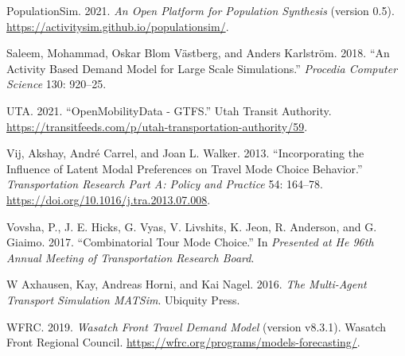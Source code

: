 \documentclass[12pt, oneside, openright]{byuthesis}
\newlength{\cslhangindent}
\newlength{\cslentryspacingunit} %
\newenvironment{CSLReferences}[2] %
 {%
  \setlength{\parindent}{0pt}
  \ifodd #1
  \let\oldpar\par
  \def\par{\hangindent=\cslhangindent\oldpar}
  \fi
  \setlength{\parskip}{#2\cslentryspacingunit}
 }%
 {}
\begin{document}
\begin{CSLReferences}{1}{0}
\leavevmode{}%
PopulationSim. 2021. \emph{An Open Platform for Population Synthesis} (version 0.5). \url{https://activitysim.github.io/populationsim/}.

\leavevmode{}%
Saleem, Mohammad, Oskar Blom Västberg, and Anders Karlström. 2018. {``An Activity Based Demand Model for Large Scale Simulations.''} \emph{Procedia Computer Science} 130: 920--25.

\leavevmode{}%
UTA. 2021. {``OpenMobilityData - GTFS.''} Utah Transit Authority. \url{https://transitfeeds.com/p/utah-transportation-authority/59}.

\leavevmode{}%
Vij, Akshay, André Carrel, and Joan L. Walker. 2013. {``Incorporating the Influence of Latent Modal Preferences on Travel Mode Choice Behavior.''} \emph{Transportation Research Part A: Policy and Practice} 54: 164--78. \url{https://doi.org/10.1016/j.tra.2013.07.008}.

\leavevmode{}%
Vovsha, P., J. E. Hicks, G. Vyas, V. Livshits, K. Jeon, R. Anderson, and G. Giaimo. 2017. {``Combinatorial Tour Mode Choice.''} In \emph{Presented at He 96th Annual Meeting of Transportation Research Board}.

\leavevmode{}%
W Axhausen, Kay, Andreas Horni, and Kai Nagel. 2016. \emph{The Multi-Agent Transport Simulation MATSim}. Ubiquity Press.

\leavevmode{}%
WFRC. 2019. \emph{Wasatch Front Travel Demand Model} (version v8.3.1). Wasatch Front Regional Council. \url{https://wfrc.org/programs/models-forecasting/}.

\end{CSLReferences}


\end{document}

